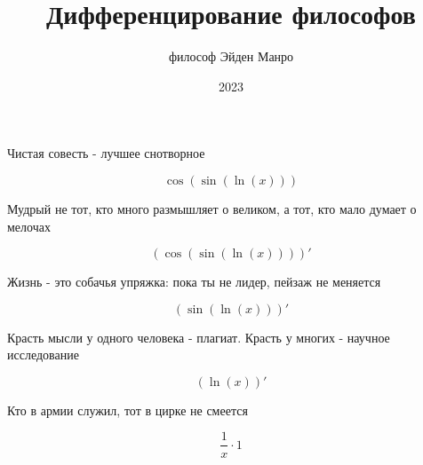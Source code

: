 \documentclass[a4paper,12pt]{article}
\title{\textbf{Дифференцирование философов}}
\author{философ Эйден Манро}
\date{2023}
\begin{document}
\maketitle
\begin{center}
Чистая совесть - лучшее снотворное
\end{center}


\begin{center}
\begin{equation}
\cos(\sin(\ln(x)))
\end{equation}
\end{center}

\begin{center}
Мудрый не тот, кто много размышляет о великом, а тот, кто мало думает о мелочах
\end{center}


\begin{center}
\begin{equation}
(\cos(\sin(\ln(x))))'
\end{equation}
\end{center}

\begin{center}
Жизнь - это собачья упряжка: пока ты не лидер, пейзаж не меняется
\end{center}


\begin{center}
\begin{equation}
(\sin(\ln(x)))'
\end{equation}
\end{center}

\begin{center}
Красть мысли у одного человека - плагиат. Красть у многих - научное исследование
\end{center}


\begin{center}
\begin{equation}
(\ln(x))'
\end{equation}
\end{center}

\begin{center}
Кто в армии служил, тот в цирке не смеется
\end{center}


\begin{center}
\begin{equation}
 \frac{1 }{ x }  \cdot 1
\end{equation}
\end{center}
\end{document}
